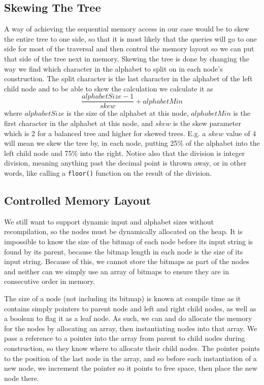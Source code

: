 \subsection{Skewing The Tree}
\label{sec:SkewingTheTree}
A way of achieving the sequential memory access in our case would be to skew the entire tree to one side, so that it is most likely that the queries will go to one side for most of the traversal and then control the memory layout so we can put that side of the tree next in memory.
Skewing the tree is done by changing the way we find which character in the alphabet to split on in each node's construction.
The split character is the last character in the alphabet of the left child node and to be able to skew the calculation we calculate it as
\[ \frac{alphabetSize-1}{skew} + alphabetMin \]
where $alphabetSize$ is the size of the alphabet at this node, $alphabetMin$ is the first character in the alphabet at this node, and $skew$ is the skew parameter which is 2 for a balanced tree and higher for skewed trees. E.g. a $skew$ value of 4 will mean we skew the tree by, in each node, putting 25\% of the alphabet into the left child node and 75\% into the right.
Notice also that the division is integer division, meaning anything past the decimal point is thrown away, or in other words, like calling a \texttt{floor()} function on the result of the division.

\subsection{Controlled Memory Layout}
We still want to support dynamic input and alphabet sizes without recompilation, so the nodes must be dynamically allocated on the heap.
It is impossible to know the size of the bitmap of each node before its input string is found by its parent, because the bitmap length in each node is the size of its input string.
Because of this, we cannot store the bitmaps as part of the nodes and neither can we simply use an array of bitmaps to ensure they are in consecutive order in memory.

The size of a node (not including its bitmap) is known at compile time as it contains simply pointers to parent node and left and right child nodes, as well as a boolean to flag it as a leaf node.
As such, we can and do allocate the memory for the nodes by allocating an array, then instantiating nodes into that array.
We pass a reference to a pointer into the array from parent to child nodes during construction, so they know where to allocate their child nodes.
The pointer points to the position of the last node in the array, and so before each instantiation of a new node, we increment the pointer so it points to free space, then place the new node there.

